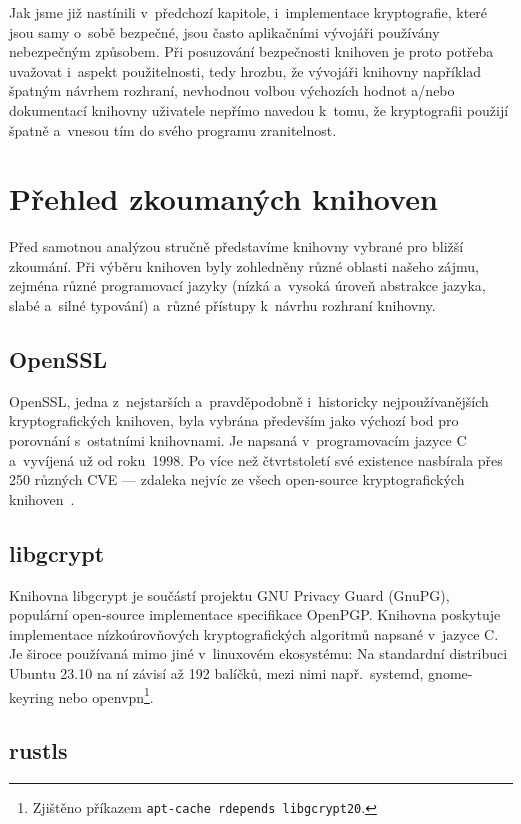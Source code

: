 Jak jsme již nastínili v~předchozí kapitole, i~implementace kryptografie, které jsou samy o~sobě bezpečné, jsou často aplikačními vývojáři používány nebezpečným způsobem. Při posuzování bez\-peč\-nos\-ti knihoven je proto potřeba uvažovat i~aspekt použitelnosti, tedy hrozbu, že vývojáři knihovny například špatným návrhem rozhraní, nevhodnou volbou výchozích hodnot a/nebo dokumentací knihovny uživatele nepřímo navedou k~tomu, že kryptografii použijí špatně a~vnesou tím do svého programu zranitelnost.

\section{Přehled zkoumaných knihoven}

Před samotnou analýzou stručně představíme knihovny vybrané pro bližší zkoumání. Při výběru knihoven byly zohledněny různé oblasti našeho zájmu, zejména různé programovací jazyky (nízká a~vysoká úroveň abstrakce jazyka, slabé a~silné typování) a~různé přístupy k~návrhu rozhraní knihovny.

\subsection*{OpenSSL}

OpenSSL, jedna z~nejstarších a~pravděpodobně i~historicky nejpoužívanějších kryptografických knihoven, byla vybrána především jako výchozí bod pro porovnání s~ostatními knihovnami. Je napsaná v~programovacím jazyce C a~vyvíjená už od roku~1998. Po více než čtvrtstoletí své existence nasbírala přes 250 různých CVE --- zdaleka nejvíc ze všech open-source kryptografických knihoven~\cite{nist-nvd}.

\subsection*{libgcrypt}

Knihovna libgcrypt je součástí projektu GNU Privacy Guard (GnuPG), populární open-source implementace specifikace OpenPGP. Knihovna poskytuje implementace nízkoúrovňových kryptografických algoritmů napsané v~jazyce C. Je široce používaná mimo jiné v~linuxovém ekosystému: Na standardní distribuci Ubuntu 23.10 na ní závisí až 192 balíčků, mezi nimi např.\ systemd, gnome-keyring nebo openvpn\footnote{Zjištěno příkazem \texttt{apt-cache rdepends libgcrypt20}.}.

\subsection*{rustls}


